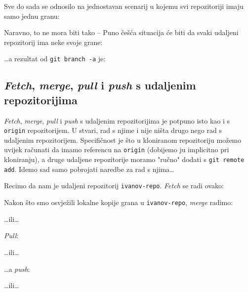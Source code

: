 Sve do sada se odnosilo na jednostavan scenarij u kojemu svi repozitoriji imaju samo jednu granu:



Naravno, to ne mora biti tako -- Puno češća situacija će biti da svaki udaljeni repozitorij ima neke svoje grane:



\dots{}a rezultat od \verb+git branch -a+ je:



\subsection*{\emph{Fetch}, \emph{merge}, \emph{pull} i \emph{push} s udaljenim repozitorijima}

\emph{Fetch}, \emph{merge}, \emph{pull} i \emph{push} s udaljenim repozitorijima je potpuno isto kao i s \verb+origin+ repozitorijem.
U stvari, rad s njime i nije ništa drugo nego rad s udaljenim repozitorijem. 
Specifičnost je što u kloniranom repozitoriju možemo uvijek računati da imamo referencu na \verb+origin+ (dobijemo ju implicitno pri kloniranju), a druge udaljene repozitorije moramo "ručno" dodati s \verb+git remote add+.
Idemo sad samo pobrojati naredbe za rad s njima\dots

Recimo da nam je udaljeni repozitorij \verb+ivanov-repo+.
\emph{Fetch} se radi ovako:


Nakon što smo osvježili lokalne kopije grana u \verb+ivanov-repo+, \emph{merge} radimo:


\dots{}ili\dots


\emph{Pull}:


\dots{}ili\dots


\dots{}a \emph{push}:


\dots{}ili\dots

